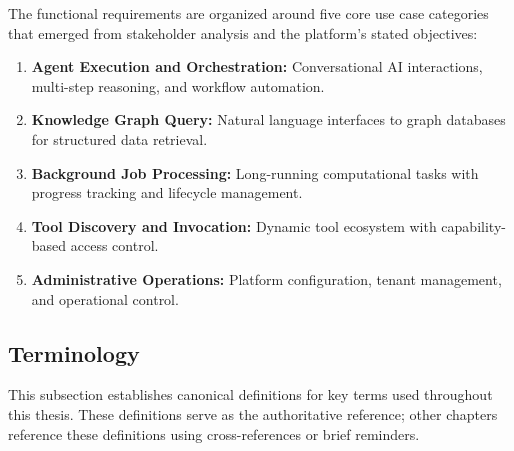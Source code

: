 \documentclass[a4paper,twoside]{sapthesis}
\begin{document}
The functional requirements are organized around five core use case categories that emerged from stakeholder analysis and the platform's stated objectives:

\begin{enumerate}
    \item \textbf{Agent Execution and Orchestration:} Conversational AI interactions, multi-step reasoning, and workflow automation.
    \item \textbf{Knowledge Graph Query:} Natural language interfaces to graph databases for structured data retrieval.
    \item \textbf{Background Job Processing:} Long-running computational tasks with progress tracking and lifecycle management.
    \item \textbf{Tool Discovery and Invocation:} Dynamic tool ecosystem with capability-based access control.
    \item \textbf{Administrative Operations:} Platform configuration, tenant management, and operational control.
\end{enumerate}

\subsection{Terminology}
\label{subsec:terminology}

This subsection establishes canonical definitions for key terms used throughout this thesis. These definitions serve as the authoritative reference; other chapters reference these definitions using cross-references or brief reminders.
\end{document}
